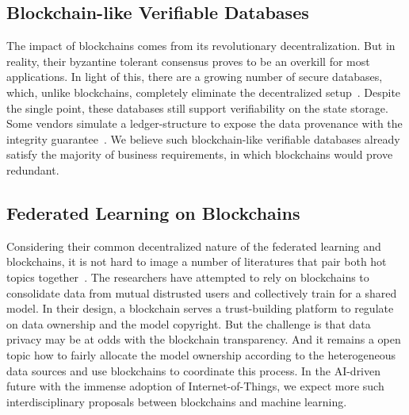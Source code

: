 \subsection{Blockchain-like Verifiable Databases}
The impact of blockchains comes from its revolutionary decentralization.
But in reality, their byzantine tolerant consensus proves to be an overkill for most applications. 
In light of this, there are a growing number of secure databases, which, unlike blockchains, completely eliminate the decentralized setup~\cite{arasu2017concerto,zhang2020spitz}. Despite the single point, these databases still support verifiability on the state storage. Some vendors simulate a ledger-structure to expose the data provenance with the integrity guarantee~\cite{qldb}. 
We believe such blockchain-like verifiable databases already satisfy the majority of business requirements, in which blockchains would prove redundant. 

\subsection{Federated Learning on Blockchains}
Considering their common decentralized nature of the federated learning and blockchains, it is not hard to image a number of literatures that pair both hot topics together~\cite{lu2019blockchain,kim2019blockchained,awan2019poster}. 
The researchers have attempted to rely on blockchains to consolidate data from mutual distrusted users and collectively train for a shared model. 
In their design, a blockchain serves a trust-building platform to regulate on data ownership and the model copyright. 
But the challenge is that data privacy may be at odds with the blockchain transparency. 
And it remains a open topic how to fairly allocate the model ownership according to the heterogeneous data sources and use blockchains to coordinate this process. 
In the AI-driven future with the immense adoption of Internet-of-Things, we expect more such interdisciplinary proposals between blockchains and machine learning. 
 